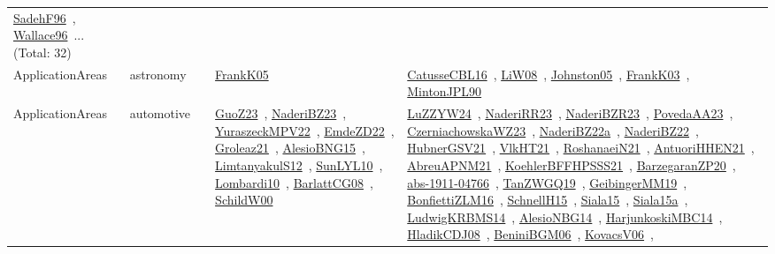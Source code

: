 {\begin{longtable}{lp{3cm}>{\raggedright\arraybackslash}p{6cm}>{\raggedright\arraybackslash}p{6cm}>{\raggedright\arraybackslash}p{8cm}}
\href{../works/SadehF96.pdf}{SadehF96}~\cite{SadehF96}, \href{../works/Wallace96.pdf}{Wallace96}~\cite{Wallace96}... (Total: 32)\\
ApplicationAreas & astronomy &  & \href{../works/FrankK05.pdf}{FrankK05}~\cite{FrankK05} & \href{../works/CatusseCBL16.pdf}{CatusseCBL16}~\cite{CatusseCBL16}, \href{../works/LiW08.pdf}{LiW08}~\cite{LiW08}, \href{../works/Johnston05.pdf}{Johnston05}~\cite{Johnston05}, \href{../works/FrankK03.pdf}{FrankK03}~\cite{FrankK03}, \href{../works/MintonJPL90.pdf}{MintonJPL90}~\cite{MintonJPL90}\\
ApplicationAreas & automotive &  & \href{../works/GuoZ23.pdf}{GuoZ23}~\cite{GuoZ23}, \href{../works/NaderiBZ23.pdf}{NaderiBZ23}~\cite{NaderiBZ23}, \href{../works/YuraszeckMPV22.pdf}{YuraszeckMPV22}~\cite{YuraszeckMPV22}, \href{../works/EmdeZD22.pdf}{EmdeZD22}~\cite{EmdeZD22}, \href{../works/Groleaz21.pdf}{Groleaz21}~\cite{Groleaz21}, \href{../works/AlesioBNG15.pdf}{AlesioBNG15}~\cite{AlesioBNG15}, \href{../works/LimtanyakulS12.pdf}{LimtanyakulS12}~\cite{LimtanyakulS12}, \href{../works/SunLYL10.pdf}{SunLYL10}~\cite{SunLYL10}, \href{../works/Lombardi10.pdf}{Lombardi10}~\cite{Lombardi10}, \href{../works/BarlattCG08.pdf}{BarlattCG08}~\cite{BarlattCG08}, \href{../works/SchildW00.pdf}{SchildW00}~\cite{SchildW00} & \href{../works/LuZZYW24.pdf}{LuZZYW24}~\cite{LuZZYW24}, \href{../works/NaderiRR23.pdf}{NaderiRR23}~\cite{NaderiRR23}, \href{../works/NaderiBZR23.pdf}{NaderiBZR23}~\cite{NaderiBZR23}, \href{../works/PovedaAA23.pdf}{PovedaAA23}~\cite{PovedaAA23}, \href{../works/CzerniachowskaWZ23.pdf}{CzerniachowskaWZ23}~\cite{CzerniachowskaWZ23}, \href{../works/NaderiBZ22a.pdf}{NaderiBZ22a}~\cite{NaderiBZ22a}, \href{../works/NaderiBZ22.pdf}{NaderiBZ22}~\cite{NaderiBZ22}, \href{../works/HubnerGSV21.pdf}{HubnerGSV21}~\cite{HubnerGSV21}, \href{../works/VlkHT21.pdf}{VlkHT21}~\cite{VlkHT21}, \href{../works/RoshanaeiN21.pdf}{RoshanaeiN21}~\cite{RoshanaeiN21}, \href{../works/AntuoriHHEN21.pdf}{AntuoriHHEN21}~\cite{AntuoriHHEN21}, \href{../works/AbreuAPNM21.pdf}{AbreuAPNM21}~\cite{AbreuAPNM21}, \href{../works/KoehlerBFFHPSSS21.pdf}{KoehlerBFFHPSSS21}~\cite{KoehlerBFFHPSSS21}, \href{../works/BarzegaranZP20.pdf}{BarzegaranZP20}~\cite{BarzegaranZP20}, \href{../works/abs-1911-04766.pdf}{abs-1911-04766}~\cite{abs-1911-04766}, \href{../works/TanZWGQ19.pdf}{TanZWGQ19}~\cite{TanZWGQ19}, \href{../works/GeibingerMM19.pdf}{GeibingerMM19}~\cite{GeibingerMM19}, \href{../works/BonfiettiZLM16.pdf}{BonfiettiZLM16}~\cite{BonfiettiZLM16}, \href{../works/SchnellH15.pdf}{SchnellH15}~\cite{SchnellH15}, \href{../works/Siala15.pdf}{Siala15}~\cite{Siala15}, \href{../works/Siala15a.pdf}{Siala15a}~\cite{Siala15a}, \href{../works/LudwigKRBMS14.pdf}{LudwigKRBMS14}~\cite{LudwigKRBMS14}, \href{../works/AlesioNBG14.pdf}{AlesioNBG14}~\cite{AlesioNBG14}, \href{../works/HarjunkoskiMBC14.pdf}{HarjunkoskiMBC14}~\cite{HarjunkoskiMBC14}, \href{../works/HladikCDJ08.pdf}{HladikCDJ08}~\cite{HladikCDJ08}, \href{../works/BeniniBGM06.pdf}{BeniniBGM06}~\cite{BeniniBGM06}, \href{../works/KovacsV06.pdf}{KovacsV06}~\cite{KovacsV06}, 
\end{longtable}}

